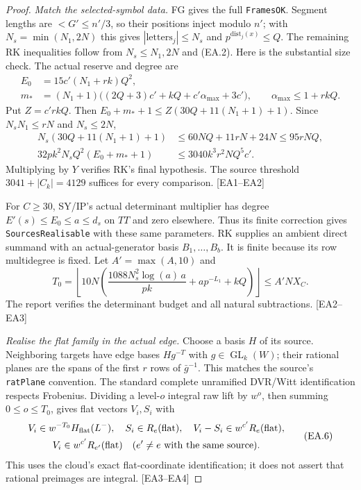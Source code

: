 \documentclass[11pt,a4paper]{article}
\numberwithin{equation}{section}
\theoremstyle{remark}\newtheorem{remark}[theorem]{Remark}
\begin{document}
\begin{proof}
\emph{Match the selected-symbol data.}
FG gives the full \texttt{FramesOK}. Segment lengths are $<G'\le n'/3$,
so their positions inject modulo $n'$; with $N_s=\min(N_1,2N)$ this gives
$|\mathrm{letters}_j|\le N_s$ and $p^{\mathrm{dist}_j(x)}\le Q$.
The remaining RK inequalities follow from $N_s\le N_1,2N$ and (EA.2).
Here is the substantial size check. The actual reserve and degree are
\[
\begin{aligned}
 E_0&=15c'(N_1+rk)Q^2,\\
 m_*&=(N_1+1)\bigl((2Q+3)c'+kQ+c'\alpha_{\max}+3c'\bigr),
 \qquad\alpha_{\max}\le1+rkQ.
\end{aligned}
\]
Put $Z=c'rkQ$. Then $E_0+m_*+1\le Z(30Q+11(N_1+1)+1)$.
Since $N_sN_1\le rN$ and $N_s\le2N$,
\[
\begin{split}
 N_s(30Q+11(N_1+1)+1)&\le60NQ+11rN+24N\le95rNQ,\\
 32pk^2N_sQ^2(E_0+m_*+1)&\le3040k^3r^2NQ^5c'.
\end{split}\tag{EA.4}
\]
Multiplying by $Y$ verifies RK's final hypothesis. The source threshold
$3041+|C_k|=4129$ suffices for every comparison. \textsf{[EA1--EA2]}

For $C\ge30$, SY/IP's actual determinant multiplier has degree
$E'(s)\le E_0\le a\le d_s$ on $TT$ and zero elsewhere. Thus its finite
correction gives \texttt{SourcesRealisable} with these same parameters.
RK supplies an ambient direct summand with an actual-generator basis
$B_1,\ldots,B_b$. It is finite because its row multidegree is fixed.
Let $A'=\max(A,10)$ and
\[
 T_0=\left\lfloor10N
 \left(\frac{1088N_s^2\log(a)\,a}{pk}+ap^{-L_1}+kQ\right)\right\rfloor
 \le A'NX_C.
 \tag{EA.5}
\]
The report verifies the determinant budget and all natural subtractions.
\textsf{[EA2--EA3]}

\emph{Realise the flat family in the actual edge.}
Choose a basis $H$ of its source. Neighboring targets have edge bases
$Hg^{-T}$ with $g\in\operatorname{GL}_k(W)$; their rational planes are
the spans of the first $r$ rows of $\bar g^{-1}$. This matches the source's
\texttt{ratPlane} convention. The standard complete unramified DVR/Witt
identification respects Frobenius. Dividing a level-$o$ integral raw lift
by $w^o$, then summing $0\le o\le T_0$, gives flat vectors $V_i,S_i$ with
\[
\begin{gathered}
 V_i\in w^{-T_0}H_{\rm flat}(L^-),\quad S_i\in R_e(\mathrm{flat}),
 \quad V_i-S_i\in w^{c'}R_e(\mathrm{flat}),\\
 V_i\in w^{c'}R_{e'}(\mathrm{flat})
 \quad(e'\ne e\text{ with the same source}).
\end{gathered}\tag{EA.6}
\]
This uses the cloud's exact flat-coordinate identification; it does not
assert that rational preimages are integral. \textsf{[EA3--EA4]}


\end{proof}
\end{document}
